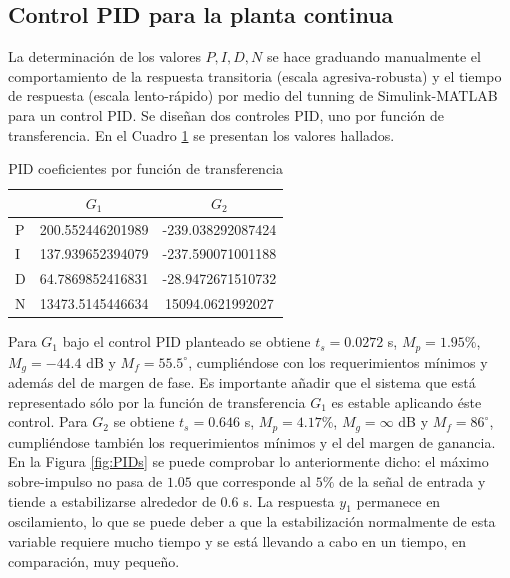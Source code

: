 \documentclass[journal]{IEEEtran}
\begin{document}
\subsection*{Control PID para la planta continua}
La determinación de los valores $P,I,D,N$ se hace graduando manualmente el comportamiento de la respuesta transitoria (escala agresiva-robusta) y el tiempo de respuesta (escala lento-rápido) por medio del tunning de Simulink-MATLAB para un control PID. Se diseñan dos controles PID, uno por función de transferencia. En el Cuadro \ref{tab:PID} se presentan los valores hallados.\\ 

\begin{table}[!h]
\centering
\caption{PID coeficientes por función de transferencia}
\label{tab:PID}
\begin{tabular}{@{}lcc@{}}
\toprule
                  & $G_1$ & $G_2$          \\ \midrule
P & 200.552446201989 & -239.038292087424 \\
I & 137.939652394079 & -237.590071001188           \\
D & 64.7869852416831 & -28.9472671510732                  \\
N & 13473.5145446634 & 15094.0621992027 \\ \bottomrule
\end{tabular}
\end{table}

Para $G_1$ bajo el control PID planteado se obtiene $t_s=0.0272$ s, $M_p=1.95\%$, $M_g=-44.4$ dB y $M_f=55.5^{\circ}$, cumpliéndose con los requerimientos mínimos y además del de margen de fase. Es importante añadir que el sistema que está representado sólo por la función de transferencia $G_1$ es estable aplicando éste control. Para $G_2$ se obtiene $t_s=0.646$ s, $M_p=4.17\%$, $M_g=\infty$ dB y $M_f=86^{\circ}$, cumpliéndose también los requerimientos mínimos y el del margen de ganancia. En la Figura \ref{fig:PIDs} se puede comprobar lo anteriormente dicho: el máximo sobre-impulso no pasa de $1.05$ que corresponde al $5\%$ de la señal de entrada y tiende a estabilizarse alrededor de $0.6$ s. La respuesta $y_1$ permanece en oscilamiento, lo que se puede deber a que la estabilización normalmente de esta variable requiere mucho tiempo y se está llevando a cabo en un tiempo, en comparación, muy pequeño.\\    
\end{document}
